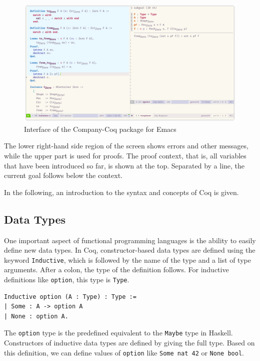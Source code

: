 \documentclass[a4paper, 11pt, fleqn, twoside]{scrreprt}
\newcommand{\hinl}[1]{\texttt{#1}}
\newcommand{\cinl}[1]{\texttt{#1}}
\begin{document}
\begin{center}
\begin{figure}[H]
\includegraphics[width=\textwidth]{img/coq.png}
\caption{Interface of the Company-Coq package for Emacs}
\label{fig:company-coq}
\end{figure}
\end{center}

The lower right-hand side region of the screen shows errors and other messages, while the upper part is used for proofs.
The proof context, that is, all variables that have been introduced so far, is shown at the top.
Separated by a line, the current goal follows below the context.

In the following, an introduction to the syntax and concepts of Coq is given.

\subsection{Data Types}
\label{subsec:coqdatatypes}
One important aspect of functional programming languages is the ability to easily define new data types.
In Coq, constructor-based data types are defined using the keyword \cinl{Inductive}, which is followed by the name of the type and a list of type arguments.
After a colon, the type of the definition follows.
For inductive definitions like \cinl{option}, this type is \cinl{Type}.

\begin{verbatim}
Inductive option (A : Type) : Type := 
| Some : A -> option A 
| None : option A.
\end{verbatim}

The \cinl{option} type is the predefined equivalent to the \hinl{Maybe} type in Haskell.
Constructors of inductive data types are defined by giving the full type.
Based on this definition, we can define values of \cinl{option} like \cinl{Some nat 42} or \cinl{None bool}.
\end{document}
